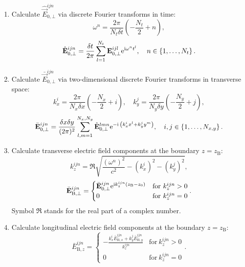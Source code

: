 \begin{enumerate}
	\item Calculate $ \hat{\vec{E}}_{0, \bot}^{ijn} $ via discrete Fourier transforms in time:
	\begin{equation}
	\omega^n = \frac{2 \pi}{N_t \delta t} \left( -\frac{N_t}{2} + n \right),
	\end{equation}
	\begin{equation}
	\hat{\mathbf{E}}_{0, \bot}^{ijn} = \frac{\delta t}{2 \pi} \sum_{l=1}^{N_t} \mathbf{E}_{0, \bot}^{ijl} \mathrm{e}^{\mathrm{i} \omega^n t^l}, \quad n \in \left\lbrace 1, \dots, N_t \right\rbrace.
	\end{equation}
	\item Calculate $ \bar{\vec{E}}_{0, \bot}^{ijn} $ via two-dimensional discrete Fourier transforms in transverse space:
	\begin{equation}
	k_x^i = \frac{2 \pi}{N_x \delta x} \left( - \frac{N_x}{2} + i\right), \quad k_y^j = \frac{2 \pi}{N_y \delta y} \left( - \frac{N_y}{2} + j\right),
	\end{equation}
	\begin{equation}
	\bar{\mathbf{E}}_{0, \bot}^{ijn} = \frac{\delta x \delta y}{(2 \pi)^2} \sum_{l, m = 1}^{N_x, N_y} \hat{\mathbf{E}}_{0, \bot}^{lmn} \mathrm{e}^{- \mathrm{i} \: \left(k_x^i x^l + k_y^j y^m \right)}, \quad i, j \in \left\lbrace 1, \dots, N_{x, y} \right\rbrace.
	\end{equation}
	\item Calculate transverse electric field components at the boundary $ z = z_\mathrm{B} $:
	\begin{equation}
	k_z^{ijn} = \Re \sqrt{\frac{(\omega^n)^2}{c^2} - (k_x^i)^2 - (k_y^j)^2},
	\end{equation}
	\begin{equation}
	\bar{\mathbf{E}}_{\mathrm{B}, \bot}^{ijn} =
	\begin{cases} \bar{\mathbf{E}}_{0, \bot}^{ijn} \mathrm{e}^{\mathrm{i} k_z^{ijn}(z_\mathrm{B} - z_0)} & \text{for} \ k_z^{ijn} > 0 \\ 0 & \text{for} \ k_z^{ijn} = 0 \end{cases}.
	\end{equation}
	Symbol $ \Re $ stands for the real part of a complex number.
	\item Calculate longitudinal electric field components at the boundary $ z = z_\mathrm{B} $:
	\begin{equation}
	\bar{E}_{\mathrm{B}, z}^{ijn} = \begin{cases} -\frac{k_x^i \bar{E}_{\mathrm{B}, x}^{ijn} + k_y^j \bar{E}_{\mathrm{B}, y}^{ijn}}{k_z^{ijn}} & \text{for} \ k_z^{ijn} > 0 \\ 0 & \text{for} \ k_z^{ijn} = 0 \end{cases}.

\end{equation}
\end{enumerate}
